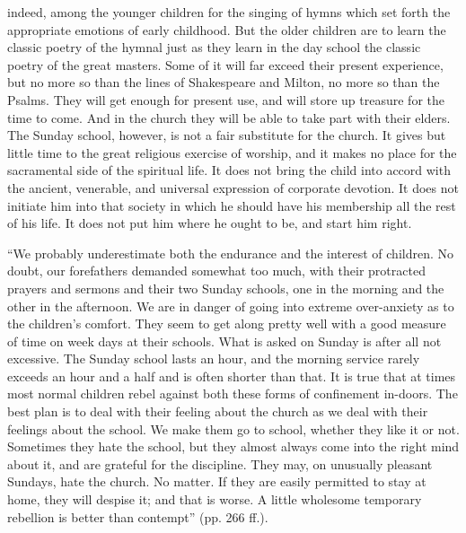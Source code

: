 indeed, among the younger children for the singing of hymns which set forth the appropriate emotions of early childhood. But the older children are to learn the classic poetry of the hymnal just as they learn in the day school the classic poetry of the great masters. Some of it will far exceed their present experience, but no more so than the lines of Shakespeare and Milton, no more so than the Psalms. They will get enough for present use, and will store up treasure for the time to come. And in the church they will be able to take part with their elders. The Sunday school, however, is not a fair substitute for the church. It gives but little time to the great religious exercise of worship, and it makes no place for the sacramental side of the spiritual life. It does not bring the child into accord with the ancient, venerable, and universal expression of corporate devotion. It does not initiate him into that society in which he should have his membership all the rest of his life. It does not put him where he ought to be, and start him right.

“We probably underestimate both the endurance and the interest of children. No doubt, our forefathers demanded somewhat too much, with their protracted prayers and sermons and their two Sunday schools, one in the morning and the other in the afternoon. We are in danger of going into extreme over-anxiety as to the children’s comfort. They seem to get along pretty well with a good measure of time on week days at their schools. What is asked on Sunday is after all not excessive. The Sunday school lasts an hour, and the morning service rarely exceeds an hour and a half and is often shorter than that. It is true that at times most normal children rebel against both these forms of confinement in-doors. The best plan is to deal with their feeling about the church as we deal with their feelings about the school. We make them go to school, whether they like it or not. Sometimes they hate the school, but they almost always come into the right mind about it, and are grateful for the discipline. They may, on unusually pleasant Sundays, hate the church. No matter. If they are easily permitted to stay at home, they will despise it; and that is worse. A little wholesome temporary rebellion is better than contempt” (pp. 266 ff.).

